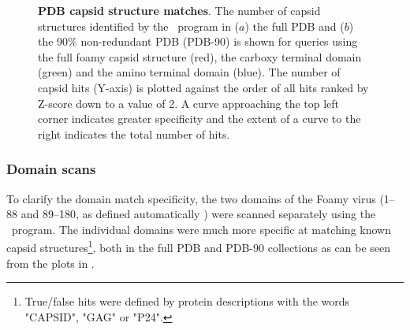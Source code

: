 % 
% 
%
 
\begin{figure}
\centering
{}
\begin{footnotesize}
\caption{
\label{Fig:rocs}
{\bf PDB capsid structure matches}.
The number of capsid structures identified by the \DALI\ program in ($a$) the full PDB and ($b$)
the 90\% non-redundant PDB (PDB-90) is shown for queries using the full foamy capsid
structure (red), the carboxy terminal domain (green) and the amino terminal domain (blue). 
The number of capsid hits (Y-axis) is plotted against the order of all hits ranked by Z-score
down to a value of 2.   A curve approaching the top left corner indicates greater specificity 
and the extent of a curve to the right indicates the total number of hits.
}
\end{footnotesize}
\end{figure}

\subsubsection{Domain scans}

To clarify the domain match specificity, the two domains of the Foamy virus (1--88 and 89--180,
as defined automatically \cite{TaylorWR99b}) were scanned separately using the \DALI\ program.  
The individual domains were much more specific at matching known capsid structures\footnote{
True/false hits were defined by protein descriptions with the words "CAPSID", "GAG" or "P24".
},   
both in the full PDB and PDB-90 collections as can be seen from the plots in .

